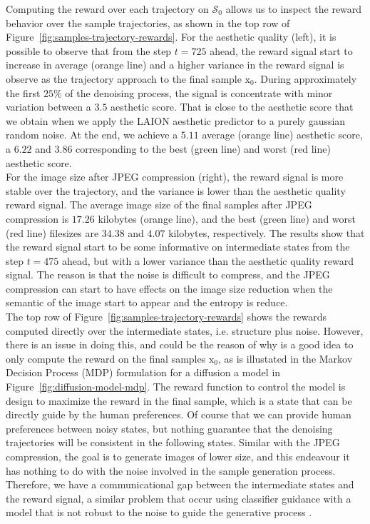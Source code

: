 \noindent Computing the reward over each trajectory on $\mathcal{S}_{0}$ allows us to inspect the reward behavior over the sample trajectories, as shown in the top row of Figure~\ref{fig:samples-trajectory-rewards}. For the aesthetic quality (left), it is possible to observe that from the step $t=725$ ahead, the reward signal start to increase in average (orange line) and a higher variance in the reward signal is observe as the trajectory approach to the final sample $\mathrm{x}_{0}$. During approximately the first $25\%$ of the denoising process, the signal is concentrate with minor variation between a $3.5$ aesthetic score. That is close to the aesthetic score that we obtain when we apply the LAION aesthetic predictor to a purely gaussian random noise. At the end, we achieve a $5.11$ average (orange line) aesthetic score, a $6.22$ and $3.86$ corresponding to the best (green line) and worst (red line) aesthetic score. \\

\noindent For the image size after JPEG compression (right), the reward signal is more stable over the trajectory, and the variance is lower than the aesthetic quality reward signal. The average image size of the final samples after JPEG compression is $17.26$ kilobytes (orange line), and the best (green line) and worst (red line) filesizes are $34.38$ and $4.07$ kilobytes, respectively. The results show that the reward signal start to be some informative on intermediate states from the step $t=475$ ahead, but with a lower variance than the aesthetic quality reward signal. The reason is that the noise is difficult to compress, and the JPEG compression can start to have effects on the image size reduction when the semantic of the image start to appear and the entropy is reduce.  \\

\noindent The top row of Figure~\ref{fig:samples-trajectory-rewards} shows the rewards computed directly over the intermediate states, i.e. structure plus noise. However, there is an issue in doing this, and could be the reason of why is a good idea to only compute the reward on the final samples $\mathrm{x}_{0}$, as is illustated in the Markov
Decision Process (MDP) formulation for a diffusion a model in Figure~\ref{fig:diffusion-model-mdp}. The reward function to control the model is design to maximize the reward in the final sample, which is a state that can be directly guide by the human preferences. Of course that we can 
provide human preferences between noisy states, but nothing guarantee that
the denoising trajectories will be consistent in the following states. Similar with the JPEG compression, the goal is to generate images of lower size, and
this endeavour it has nothing to do with the noise involved in the sample generation process. Therefore, we have a communicational gap between the intermediate states and the reward signal, a similar problem that occur using
classifier guidance with a model that is not robust to the noise to guide
the generative process \cite{bansal2023universal}. \\


